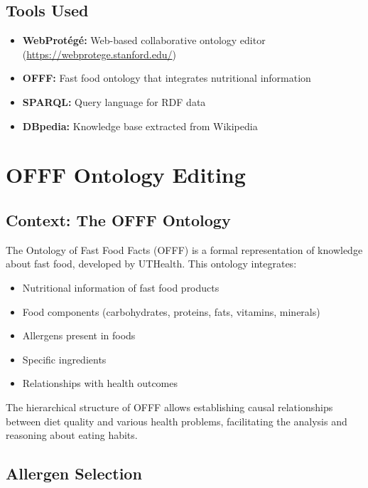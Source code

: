 \documentclass[12pt,a4paper]{article}
\begin{document}
\subsection{Tools Used}

\begin{itemize}
    \item \textbf{WebProtégé:} Web-based collaborative ontology editor (\url{https://webprotege.stanford.edu/})
    \item \textbf{OFFF:} Fast food ontology that integrates nutritional information
    \item \textbf{SPARQL:} Query language for RDF data
    \item \textbf{DBpedia:} Knowledge base extracted from Wikipedia
\end{itemize}

\section{OFFF Ontology Editing}

\subsection{Context: The OFFF Ontology}

The Ontology of Fast Food Facts (OFFF) is a formal representation of knowledge about fast food, developed by UTHealth. This ontology integrates:

\begin{itemize}
    \item Nutritional information of fast food products
    \item Food components (carbohydrates, proteins, fats, vitamins, minerals)
    \item Allergens present in foods
    \item Specific ingredients
    \item Relationships with health outcomes
\end{itemize}

The hierarchical structure of OFFF allows establishing causal relationships between diet quality and various health problems, facilitating the analysis and reasoning about eating habits.

\subsection{Allergen Selection}
\end{document}
